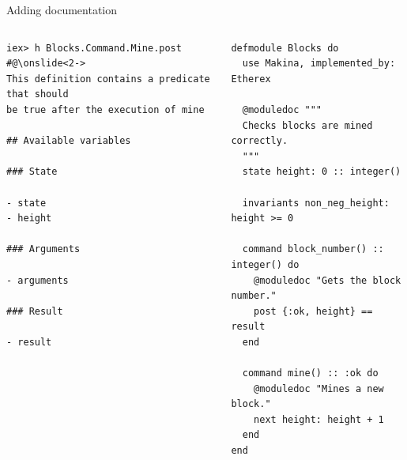 \documentclass[aspectratio=169, 10pt, handout]{beamer}
\begin{document}
\begin{frame}[label={sec:orgfc0e765},fragile]{Adding documentation}
 \begin{columns}
\begin{column}{0.48\columnwidth}
\lstset{language=bash,label= ,caption= ,captionpos=b,numbers=none,style=shell}
\begin{lstlisting}
iex> h Blocks.Command.Mine.post
#@\onslide<2->
This definition contains a predicate that should
be true after the execution of mine

## Available variables

### State

- state
- height

### Arguments

- arguments

### Result

- result
\end{lstlisting}
\end{column}

\begin{column}{0.48\columnwidth}
\lstset{language=elixir,label= ,caption= ,captionpos=b,numbers=none,style=display}
\begin{lstlisting}
defmodule Blocks do
  use Makina, implemented_by: Etherex

  @moduledoc """
  Checks blocks are mined correctly.
  """
  state height: 0 :: integer()

  invariants non_neg_height: height >= 0

  command block_number() :: integer() do
    @moduledoc "Gets the block number."
    post {:ok, height} == result
  end

  command mine() :: :ok do
    @moduledoc "Mines a new block."
    next height: height + 1
  end
end
\end{lstlisting}
\end{column}
\end{columns}
\end{frame}
\end{document}
